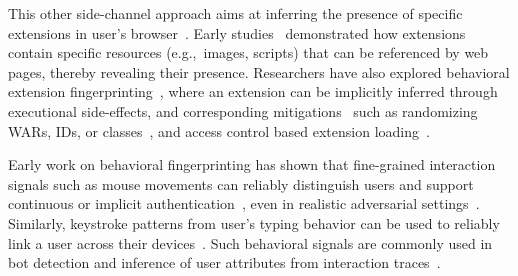 %
This other side-channel approach aims at inferring the presence of specific extensions in user's browser~\cite{karamiCarnusExploringPrivacy2020}. 
%
Early studies~\cite{sjostenDiscoveringBrowserExtensions2017, gulyasExtendNotExtend2018, karamiCarnusExploringPrivacy2020} demonstrated how extensions contain specific resources (e.g.,~images, scripts) that can be referenced by web pages, thereby revealing their presence. 
%
Researchers have also explored behavioral extension fingerprinting~\cite{starovXHOUNDQuantifyingFingerprintability2017, karamiCarnusExploringPrivacy2020, solomosDangersHumanTouch2022, solomosEscapingConfinesTime2022, laperdrixFingerprintingStyleDetecting2021, agarwalPeekingWindowFingerprinting2024}, where an extension can be implicitly inferred through executional side-effects, and corresponding mitigations~\cite{karamiUnleashSimulacrumShifting2022, sanchez-rolaExtensionBreakdownSecurity2017} such as randomizing WARs, IDs, or classes~\cite{trickelEveryoneDifferentClientside2019}, and access control based extension loading~\cite{sjostenLatexGlovesProtecting2019}. 


%
%
Early work on behavioral fingerprinting has shown that fine-grained interaction signals such as mouse movements can reliably distinguish users and support continuous or implicit authentication~\cite{zhengEfficientUserVerification2011,jorgensenMouseDynamicsBehavioral2011}, even in realistic adversarial settings~\cite{fereidooniAuthentiSenseScalableBehavioral2023}. 
%
Similarly, keystroke patterns from user's typing behavior can be used to reliably link a user across their devices~\cite{yuanCrossdeviceTrackingIdentification2018}.
%
Such behavioral signals are commonly used in bot detection and inference of user attributes from interaction traces~\cite{leivaMyMouseMy2021}. 


